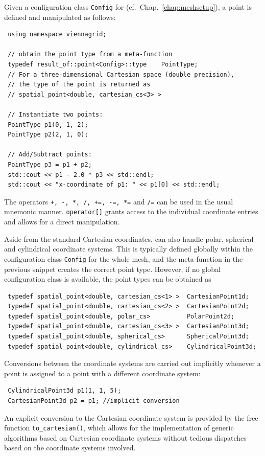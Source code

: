Given a configuration class \lstinline|Config| for {\ViennaGrid} (cf.~Chap.~\ref{chap:meshsetup}), a point is defined and manipulated as follows:
\begin{lstlisting}
 using namespace viennagrid;

 // obtain the point type from a meta-function
 typedef result_of::point<Config>::type    PointType;
 // For a three-dimensional Cartesian space (double precision),
 // the type of the point is returned as
 // spatial_point<double, cartesian_cs<3> >

 // Instantiate two points:
 PointType p1(0, 1, 2);
 PointType p2(2, 1, 0);

 // Add/Subtract points:
 PointType p3 = p1 + p2;
 std::cout << p1 - 2.0 * p3 << std::endl;
 std::cout << "x-coordinate of p1: " << p1[0] << std::endl;
\end{lstlisting}
The operators \lstinline|+, -, *, /, +=, -=, *=| and \lstinline|/=| can be used in the usual mnemonic manner. \lstinline|operator[]| grants access to the individual coordinate entries and allows for a direct manipulation.

Aside from the standard Cartesian coordinates, {\ViennaGrid} can also handle polar, spherical and cylindrical coordinate systems.
This is typically defined globally within the configuration class \lstinline|Config| for the whole mesh, and the meta-function in the previous snippet creates the correct point type. However, if no global configuration class is available, the point types can be obtained as
\begin{lstlisting}
 typedef spatial_point<double, cartesian_cs<1> >  CartesianPoint1d;
 typedef spatial_point<double, cartesian_cs<2> >  CartesianPoint2d;
 typedef spatial_point<double, polar_cs>          PolarPoint2d;
 typedef spatial_point<double, cartesian_cs<3> >  CartesianPoint3d;
 typedef spatial_point<double, spherical_cs>      SphericalPoint3d;
 typedef spatial_point<double, cylindrical_cs>    CylindricalPoint3d;
\end{lstlisting}
Conversions between the coordinate systems are carried out implicitly whenever a point is assigned to a point with a different coordinate system:
\begin{lstlisting}
 CylindricalPoint3d p1(1, 1, 5);
 CartesianPoint3d p2 = p1; //implicit conversion
\end{lstlisting}
An explicit conversion to the Cartesian coordinate system is provided by the free function \lstinline|to_cartesian()|, which allows for the implementation of generic algorithms based on Cartesian coordinate systems without tedious dispatches based on the coordinate systems involved.


